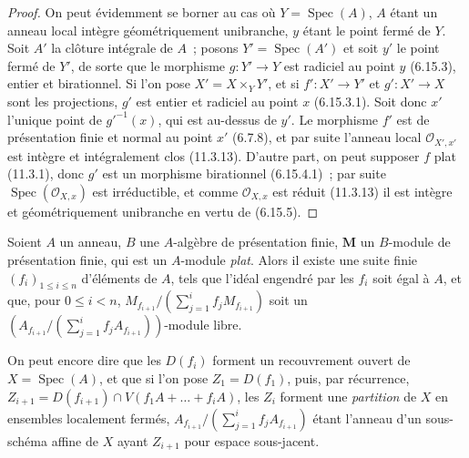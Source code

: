 \begin{proof}
On peut évidemment se borner au cas où $Y=\operatorname{Spec}(A)$, $A$ étant
un anneau local intègre géométriquement unibranche, $y$ étant le point fermé de
$Y$. Soit $A'$ la clôture intégrale de $A$~; posons
$Y'=\operatorname{Spec}(A')$ et soit $y'$ le point fermé de $Y'$, de sorte que
le morphisme $g:Y'\to Y$ est radiciel au point $y$ (6.15.3), entier et
birationnel. Si l'on pose $X'=X\times_Y Y'$, et si $f':X'\to Y'$ et
$g':X'\to X$ sont les projections, $g'$ est entier et radiciel au point $x$
(6.15.3.1). Soit donc $x'$ l'unique point de $g'^{-1}(x)$, qui est au-dessus
de $y'$. Le morphisme $f'$ est de présentation finie et normal au point $x'$
(6.7.8), et par suite l'anneau local $\mathcal O_{X',x'}$ est intègre et
intégralement clos (11.3.13). D'autre part, on peut supposer $f$ plat (11.3.1),
donc $g'$ est un morphisme birationnel (6.15.4.1)~; par suite
$\operatorname{Spec}(\mathcal O_{X,x})$ est irréductible, et comme
$\mathcal O_{X,x}$ est réduit (11.3.13) il est intègre et géométriquement
unibranche en vertu de (6.15.5).
\end{proof}

\begin{proposition}[11.3.15]
\label{IV.11.3.15-fr}
Soient $A$ un anneau, $B$ une $A$-algèbre de présentation finie, $\mathbf{M}$ un
$B$-module de présentation finie, qui est un $A$-module \emph{plat}. Alors il existe
une suite finie $(f_i)_{1\leq i\leq n}$ d'éléments de $A$, tels que l'idéal
engendré par les $f_i$ soit égal à $A$, et que, pour $0\leq i<n$,
$M_{f_{i+1}}/(\sum_{j=1}^{i}f_jM_{f_{i+1}})$
soit un
$(A_{f_{i+1}}\big/(\sum_{j=1}^{i}f_jA_{f_{i+1}}))$-module libre.
\end{proposition}

On peut encore dire que les $D(f_i)$ forment un recouvrement ouvert de
$X=\operatorname{Spec}(A)$, et que si l'on pose $Z_1=D(f_1)$, puis, par
récurrence, $Z_{i+1}=D(f_{i+1})\cap V(f_1A+\ldots+f_iA)$,
les $Z_i$ forment une \emph{partition} de $X$ en ensembles localement fermés,
$A_{f_{i+1}}/(\sum_{j=1}^{i}f_jA_{f_{i+1}})$ étant l'anneau d'un sous-schéma
affine de $X$ ayant $Z_{i+1}$ pour espace sous-jacent.

